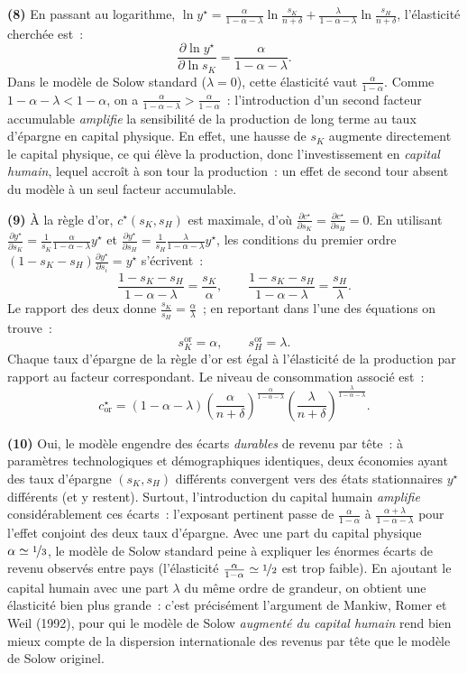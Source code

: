 \documentclass[11pt,a4paper,notitlepage]{article}
\begin{document}
\textbf{(8)} En passant au logarithme,
$\ln y^{\star}=\frac{\alpha}{1-\alpha-\lambda}\ln\frac{s_K}{n+\delta}
+\frac{\lambda}{1-\alpha-\lambda}\ln\frac{s_H}{n+\delta}$, l'élasticité
cherchée est~:
\[
\frac{\partial \ln y^{\star}}{\partial \ln s_K} = \frac{\alpha}{1-\alpha-\lambda}.
\]
Dans le modèle de Solow standard ($\lambda=0$), cette élasticité vaut
$\frac{\alpha}{1-\alpha}$. Comme $1-\alpha-\lambda<1-\alpha$, on a
$\frac{\alpha}{1-\alpha-\lambda} > \frac{\alpha}{1-\alpha}$~:
l'introduction d'un second facteur accumulable \emph{amplifie} la
sensibilité de la production de long terme au taux d'épargne en
capital physique. En effet, une hausse de $s_K$ augmente directement le
capital physique, ce qui élève la production, donc l'investissement en
\emph{capital humain}, lequel accroît à son tour la production~: un
effet de second tour absent du modèle à un seul facteur accumulable.

\textbf{(9)} À la règle d'or, $c^{\star}(s_K,s_H)$ est maximale, d'où
$\frac{\partial c^{\star}}{\partial s_K}=\frac{\partial c^{\star}}{\partial s_H}=0$.
En utilisant
$\frac{\partial y^{\star}}{\partial s_K}=\frac{1}{s_K}\frac{\alpha}{1-\alpha-\lambda}y^{\star}$
et
$\frac{\partial y^{\star}}{\partial s_H}=\frac{1}{s_H}\frac{\lambda}{1-\alpha-\lambda}y^{\star}$,
les conditions du premier ordre
$(1-s_K-s_H)\frac{\partial y^{\star}}{\partial s_i}=y^{\star}$ s'écrivent~:
\[
\frac{1-s_K-s_H}{1-\alpha-\lambda} = \frac{s_K}{\alpha},
\qquad
\frac{1-s_K-s_H}{1-\alpha-\lambda} = \frac{s_H}{\lambda}.
\]
Le rapport des deux donne $\frac{s_K}{s_H}=\frac{\alpha}{\lambda}$~;
en reportant dans l'une des équations on trouve~:
\[
\boxed{\,s_K^{\mathrm{or}}=\alpha,\qquad s_H^{\mathrm{or}}=\lambda.\,}
\]
Chaque taux d'épargne de la règle d'or est égal à l'élasticité de la
production par rapport au facteur correspondant. Le niveau de
consommation associé est~:
\[
c^{\star}_{\mathrm{or}} = (1-\alpha-\lambda)
\left(\frac{\alpha}{n+\delta}\right)^{\frac{\alpha}{1-\alpha-\lambda}}
\left(\frac{\lambda}{n+\delta}\right)^{\frac{\lambda}{1-\alpha-\lambda}}.
\]

\textbf{(10)} Oui, le modèle engendre des écarts \emph{durables} de
revenu par tête~: à paramètres technologiques et démographiques
identiques, deux économies ayant des taux d'épargne $(s_K,s_H)$
différents convergent vers des états stationnaires $y^{\star}$
différents (et y restent). Surtout, l'introduction du capital humain
\emph{amplifie} considérablement ces écarts~: l'exposant pertinent
passe de $\frac{\alpha}{1-\alpha}$ à
$\frac{\alpha+\lambda}{1-\alpha-\lambda}$ pour l'effet conjoint des deux
taux d'épargne. Avec une part du capital physique
$\alpha\simeq\nicefrac13$, le modèle de Solow standard peine à
expliquer les énormes écarts de revenu observés entre pays
(l'élasticité $\frac{\alpha}{1-\alpha}\simeq\nicefrac12$ est trop
faible). En ajoutant le capital humain avec une part $\lambda$ du même
ordre de grandeur, on obtient une élasticité bien plus grande~: c'est
précisément l'argument de Mankiw, Romer et Weil (1992), pour qui le
modèle de Solow \emph{augmenté du capital humain} rend bien mieux
compte de la dispersion internationale des revenus par tête que le
modèle de Solow originel.
\end{document}
